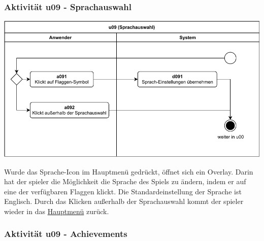 \clearpage

\subsubsection{Aktivität u09 - Sprachauswahl}

\vspace*{1cm}

\includegraphics[width=\linewidth]{diagramme/pdf/UML-Activity-u09.pdf}
\label{fig:dia:language}
\vspace*{0.5cm}



Wurde das Sprache-Icon im Hauptmenü gedrückt, öffnet sich ein Overlay. Darin hat der \gls{spieler} die Möglichkeit die Sprache des Spiels zu ändern, indem er auf eine der verfügbaren Flaggen klickt. Die Standardeinstellung der Sprache ist Englisch. Durch das Klicken außerhalb der Sprachauswahl kommt der \gls{spieler} wieder in das \hyperref[fig:dia:mainMenu]{Hauptmenü} zurück.

\clearpage

\subsubsection{Aktivität u09 - Achievements}

\vspace*{1cm}


